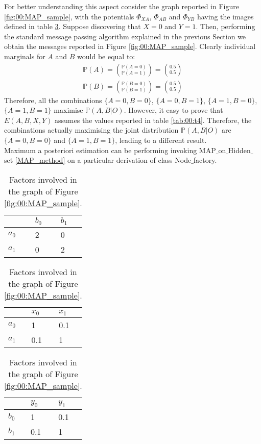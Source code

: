 For better understanding this aspect consider the graph reported in Figure \ref{fig:00:MAP_sample}, with the potentials $\Phi _{XA}$, $\Phi _{AB}$ and $\Phi _{YB}$ having the images defined in table \ref{tab:00:t3}.
Suppose discovering that $X=0$ and $Y=1$. Then, performing the standard message passing algorithm explained in the previous Section we obtain the messages reported in Figure \ref{fig:00:MAP_sample}. Clearly individual marginals for $A$ and $B$ would be equal to:
\begin{eqnarray}
\mathbb{P}(A)= \binom{\mathbb{P}(A=0)}{\mathbb{P}(A=1)} = \binom{0.5}{0.5} \nonumber\\
\mathbb{P}(B)= \binom{\mathbb{P}(B=0)}{\mathbb{P}(B=1)} = \binom{0.5}{0.5}
\end{eqnarray}
Therefore, all the combinations $\lbrace A=0, B=0 \rbrace$, $\lbrace A=0, B=1 \rbrace$, $\lbrace A=1, B=0 \rbrace$, $\lbrace A=1, B=1 \rbrace$ maximise $\mathbb{P}(A,B | O)$. However, it easy to prove that $E(A,B,X,Y)$ assumes the values reported in table \ref{tab:00:t4}.
Therefore, the combinations actually maximising the joint distribution $\mathbb{P}(A,B | O)$ are $\lbrace A=0, B=0 \rbrace$ and $\lbrace A=1, B=1 \rbrace$, leading to a different result.
\\
Maximum a posteriori estimation can be performing invoking MAP$\_$on$\_$Hidden$\_$set \ref{MAP_method} on a particular derivation of class Node$\_$factory. 

\begin{table}[]
\centering
\begin{tabular}{l|l|l|}
      & $b_0$ & $b_1$ \\
      \hline
$a_0$ & 2     & 0  \\
\hline
$a_1$ & 0     & 2  \\
\hline 
\end{tabular}
\quad
\begin{tabular}{l|l|l|}
      & $x_0$ & $x_1$ \\
      \hline
$a_0$ & 1     & 0.1  \\
\hline
$a_1$ & 0.1   & 1  \\
\hline 
\end{tabular}
\quad
\begin{tabular}{l|l|l|}
      & $y_0$ & $y_1$ \\
      \hline
$b_0$ & 1     & 0.1  \\
\hline
$b_1$ & 0.1   & 1  \\
\hline 
\end{tabular}
\caption{Factors involved in the graph of Figure \ref{fig:00:MAP_sample}.} 
\label{tab:00:t3}
\end{table}

